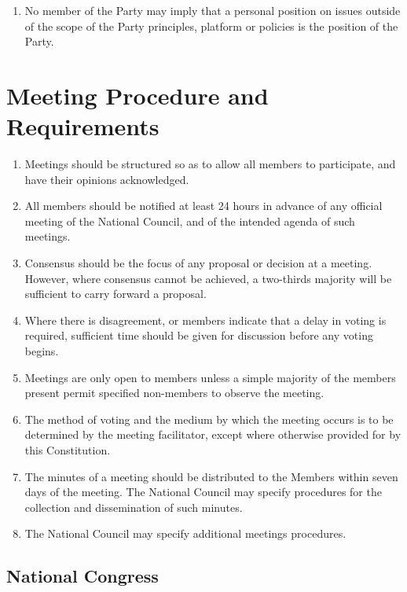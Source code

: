 \documentclass[a4paper,titlepage,8.5pt]{article}
\begin{document}
\begin{enumerate}
\item No member of the Party may imply that a personal position on issues outside of the scope of the Party principles, platform or policies is the position of the Party.
\end{enumerate}

\section{Meeting Procedure and Requirements}

\begin{enumerate}
\item Meetings should be structured so as to allow all members to participate, and have their opinions acknowledged.
\item All members should be notified at least 24 hours in advance of any official meeting of the National Council, and of the intended agenda of such meetings.
\item Consensus should be the focus of any proposal or decision at a meeting. However, where consensus cannot be achieved, a two-thirds majority will be sufficient to carry forward a proposal.
\item Where there is disagreement, or members indicate that a delay in voting is required, sufficient time should be given for discussion before any voting begins.
\item Meetings are only open to members unless a simple majority of the members present permit specified non-members to observe the meeting.
\item The method of voting and the medium by which the meeting occurs is to be determined by the meeting facilitator, except where otherwise provided for by this Constitution.
\item The minutes of a meeting should be distributed to the Members within seven days of the meeting. The National Council may specify procedures for the collection and dissemination of such minutes.
\item The National Council may specify additional meetings procedures.
\end{enumerate}

\subsection{National Congress}
\end{document}
